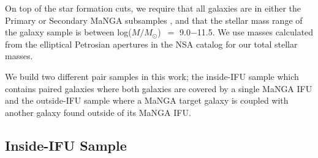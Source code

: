 \documentclass[iop,revtex4,twocolumn,apj,numberedappendix,appendixfloats]{emulateapj}
\newcommand{\logm}{log($M/M_{\odot}$)}
\begin{document}
On top of the star formation cuts, we require that all galaxies are in either the Primary or Secondary MaNGA subsamples \citep{Wake:2017}, and that the stellar mass range of the galaxy sample is between \logm\ $=$ 9.0$-$11.5. We use masses calculated from the elliptical Petrosian apertures in the NSA catalog for our total stellar masses. 

We build two different pair samples in this work; the inside-IFU sample which contains paired galaxies where both galaxies are covered by a single MaNGA IFU and the outside-IFU sample where a MaNGA target galaxy is coupled with another galaxy found outside of its MaNGA IFU. 

\subsection{Inside-IFU Sample}\label{sec:inside}
\end{document}
